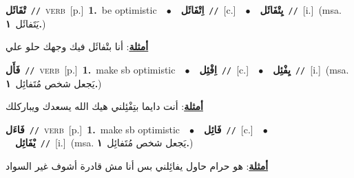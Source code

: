 \documentclass[10pt,a4paper,twoside]{article} %
\begin{document}
\begin{multicols}{2}
{\setlength\topsep{0pt}\textbf{\foreignlanguage{arabic}{تْفَائَل}}\ {\color{gray}\texttt{//}\color{black}}\ \textsc{verb}\ [p.]\ \textbf{1.}~be optimistic\ \ $\bullet$\ \ \setlength\topsep{0pt}\textbf{\foreignlanguage{arabic}{اِتْفَائَل}}\ {\color{gray}\texttt{//}\color{black}}\ [c.]\ \ $\bullet$\ \ \setlength\topsep{0pt}\textbf{\foreignlanguage{arabic}{يِتْفَائَل}}\ {\color{gray}\texttt{//}\color{black}}\ [i.]\ \color{gray}(msa. \foreignlanguage{arabic}{يَتَفائَل}~\foreignlanguage{arabic}{\textbf{١.}})\color{black}\  \begin{flushright}\color{gray}\foreignlanguage{arabic}{\textbf{\underline{\foreignlanguage{arabic}{أمثلة}}}: أنا بتْفائَل فيك وجهك حلو علي}\end{flushright}\color{black}} \vspace{2mm}

{\setlength\topsep{0pt}\textbf{\foreignlanguage{arabic}{فَأَل}}\ {\color{gray}\texttt{//}\color{black}}\ \textsc{verb}\ [p.]\ \textbf{1.}~make sb optimistic\ \ $\bullet$\ \ \setlength\topsep{0pt}\textbf{\foreignlanguage{arabic}{اِفْئِل}}\ {\color{gray}\texttt{//}\color{black}}\ [c.]\ \ $\bullet$\ \ \setlength\topsep{0pt}\textbf{\foreignlanguage{arabic}{يِفْئِل}}\ {\color{gray}\texttt{//}\color{black}}\ [i.]\ \color{gray}(msa. \foreignlanguage{arabic}{يَجعل شخص مُتَفائِل}~\foreignlanguage{arabic}{\textbf{١.}})\color{black}\  \begin{flushright}\color{gray}\foreignlanguage{arabic}{\textbf{\underline{\foreignlanguage{arabic}{أمثلة}}}: أنت دايما بتِفْئِلني هيك الله يسعدك ويباركلك}\end{flushright}\color{black}} \vspace{2mm}

{\setlength\topsep{0pt}\textbf{\foreignlanguage{arabic}{فَاءَل}}\ {\color{gray}\texttt{//}\color{black}}\ \textsc{verb}\ [p.]\ \textbf{1.}~make sb optimistic\ \ $\bullet$\ \ \setlength\topsep{0pt}\textbf{\foreignlanguage{arabic}{فَائِل}}\ {\color{gray}\texttt{//}\color{black}}\ [c.]\ \ $\bullet$\ \ \setlength\topsep{0pt}\textbf{\foreignlanguage{arabic}{يْفَائِل}}\ {\color{gray}\texttt{//}\color{black}}\ [i.]\ \color{gray}(msa. \foreignlanguage{arabic}{يَجعل شخص مُتَفائِل}~\foreignlanguage{arabic}{\textbf{١.}})\color{black}\  \begin{flushright}\color{gray}\foreignlanguage{arabic}{\textbf{\underline{\foreignlanguage{arabic}{أمثلة}}}: هو حرام حاول يفائِلني بس أنا مش قادرة أشوف غير السواد}\end{flushright}\color{black}} \vspace{2mm}


\end{multicols}
\end{document}
